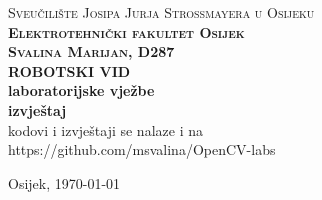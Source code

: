 \newpage
\begin{titlepage}
\begin{center}
\newcommand{\HRule}[1]{\rule{\linewidth}{#1}}

\textsc{Sveučilište Josipa Jurja Strossmayera u Osijeku}\\[0.2cm]
\textbf{\textsc{Elektrotehnički fakultet Osijek}}\\[4.5cm]


{\large \bfseries \textsc{Svalina Marijan, D287} \\ [1 cm] } 
{\LARGE \bfseries \color{MidnightBlue} 
ROBOTSKI VID \\ laboratorijske vježbe \\ [0.5cm] }
{\large \bfseries izvještaj} \\ [5.2cm]
{\large kodovi i izvještaji se nalaze i na} \\ [0.2cm]
{\large https://github.com/msvalina/OpenCV-labs} \\ [0.2cm]



\vfill

\begin{minipage}{0.4\textwidth}
\begin{center} \large
Osijek, \today \\
\end{center}


\end{minipage}
\end{center}
\end{titlepage}
\newpage
\renewcommand{\cftsecleader}{\cftdotfill{\cftdotsep}}
\tableofcontents 
\thispagestyle{empty}

\newpage
\setcounter{page}{1}
